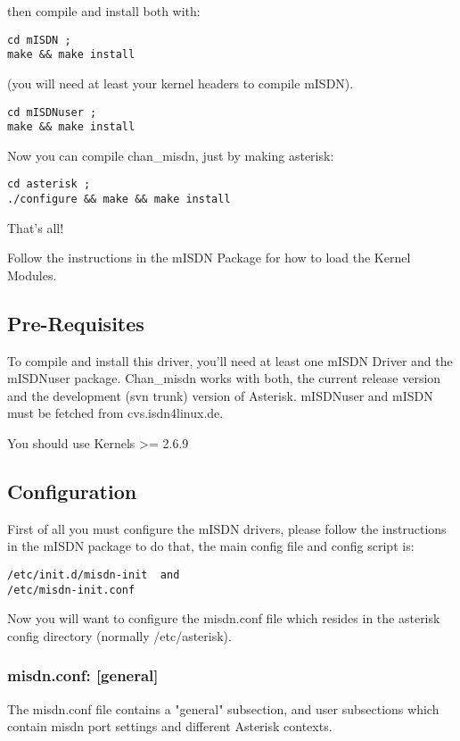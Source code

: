then compile and install both with:

\begin{verbatim}
cd mISDN ;
make && make install
\end{verbatim}

(you will need at least your kernel headers to compile mISDN).

\begin{verbatim}
cd mISDNuser ;
make && make install
\end{verbatim}

Now you can compile chan\_misdn, just by making asterisk: 

\begin{verbatim}
cd asterisk ; 
./configure && make && make install
\end{verbatim}

That's all!

Follow the instructions in the mISDN Package for how to load the Kernel
Modules.

\subsection{Pre-Requisites}

To compile and install this driver, you'll need at least one mISDN Driver and
the mISDNuser package. Chan\_misdn works with both, the current release version
and the development (svn trunk) version of Asterisk. mISDNuser and mISDN must
be fetched from cvs.isdn4linux.de.

You should use Kernels >= 2.6.9 


\subsection{Configuration}

First of all you must configure the mISDN drivers, please follow the
instructions in the mISDN package to do that, the main config file and config
script is:

\begin{verbatim}
/etc/init.d/misdn-init  and
/etc/misdn-init.conf
\end{verbatim}

Now you will want to configure the misdn.conf file which resides in the
asterisk config directory (normally /etc/asterisk).

\subsubsection{misdn.conf: [general]}
The misdn.conf file contains a "general" subsection, and user subsections which
contain misdn port settings and different Asterisk contexts.

